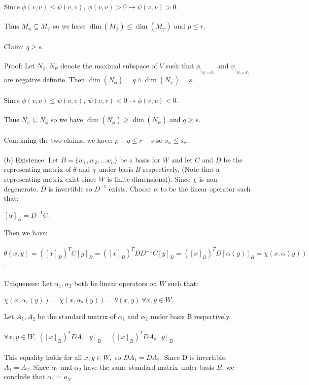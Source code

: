 \documentclass{article}
\begin{document}
Since $\phi(v,v) \leq \psi(v,v),\ \phi(v,v) > 0 \to \psi(v,v) > 0$.\\\\
Thus $M_\phi \subseteq M_\psi$ so we have $\dim(M_\phi) \leq \dim(M_\psi)$ and $p\leq r$.\\\\
Claim: $q\geq s.$\\\\
Proof: Let $N_\phi,N_\psi$ denote the maximal subspace of $V$ such that $\phi_{|_{N_\phi\times N_\phi}}$ and $\psi_{|_{N_\psi\times N_\psi}}$ are negative definite. Then $\dim(N_\phi) = q \land \dim(N_\psi) = s$.\\\\
Since $\phi(v,v) \leq \psi(v,v),\  \psi(v,v) < 0 \to \phi(v,v) < 0$.\\\\Thus $ N_\psi \subseteq N_\phi$ so we have $\dim(N_\phi) \geq \dim(N_\psi)$ and $q\geq s$.\\\\
Combining the two claims, we have: $p-q\leq r-s $ so $s_\phi \leq s_\psi$.\\\\
(b) Existence: Let $B=\{w_1,w_2,...w_n\}$ be a basis for $W$ and let $C$ and $D$ be the representing matrix of $\theta$ and $\chi$ under basis $B$ respectively. (Note that a \\representing matrix exist since $W$ is finite-dimensional). Since $\chi$ is non-degenerate, $D$ is invertible so $D^{-1}$ exists. Choose $\alpha$ to be the linear operator such that:\begin{center}
    $[\alpha]_B = D^{-1}C$.
\end{center}
Then we have:\\\\ $\theta(x,y) = ([x]_B)^TC[y]_B = ([x]_B)^TDD^{-1}C[y]_B = ([x]_B)^TD[\alpha(y)]_B = \chi(x,\alpha(y))$.\\\\
Uniqueness: Let $\alpha_1,\alpha_2$ both be linear operators on $W$ such that:\begin{center}
    $\chi(x,\alpha_1(y)) = \chi(x,\alpha_2(y)) = \theta(x,y)\ \forall x,y\in W$.
\end{center}
Let $A_1,A_2$ be the standard matrix of $\alpha_1$ and $\alpha_2$ under basis B respectively.\\\\
$\forall x,y\in W, \ ([x]_B)^TDA_1[y]_B = ([x]_B)^TDA_2[y]_B.$\\\\
This equality holds for all $x,y \in W,$ so $ DA_1 = DA_2.$ Since D is invertible, $A_1 = A_2$.  Since $\alpha_1$ and $\alpha_2$ have the same standard matrix under basis $B$, we conclude that $\alpha_1 = \alpha_2$.
\end{document}
